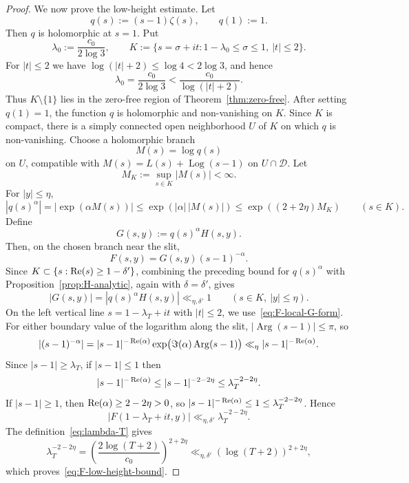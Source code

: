 \begin{proof}
We now prove the low-height estimate. Let
\[
    q(s):=(s-1)\zeta(s),
    \qquad q(1):=1.
\]
Then $q$ is holomorphic at $s=1$. Put
\[
    \lambda_0:=\frac{c_0}{2\log 3},
    \qquad
    K:=\{s=\sigma+it:1-\lambda_0\leq\sigma\leq1,\ |t|\leq2\}.
\]
For $|t|\leq2$ we have $\log(|t|+2)\leq\log4<2\log3$, and hence
\[
    \lambda_0=\frac{c_0}{2\log3}<\frac{c_0}{\log(|t|+2)}.
\]
Thus $K\setminus\{1\}$ lies in the zero-free region of
Theorem~\ref{thm:zero-free}. After setting $q(1)=1$, the function
$q$ is holomorphic and non-vanishing on $K$. Since $K$ is compact,
there is a simply connected open neighborhood $U$ of $K$ on which $q$ is
non-vanishing. Choose a holomorphic branch
\[
    M(s)=\log q(s)
\]
on $U$, compatible with $M(s)=L(s)+\operatorname{Log}(s-1)$
on $U\cap\mathcal{D}$.
Let
\[
    M_K:=\sup_{s\in K}|M(s)|<\infty.
\]
For $|y|\leq\eta$,
\[
    |q(s)^\alpha|
    =|\exp(\alpha M(s))|
    \leq \exp(|\alpha|\,|M(s)|)
    \leq \exp((2+2\eta)M_K)
    \qquad (s\in K).
\]
Define
\begin{equation}\label{eq:G-local-def}
    G(s,y):=q(s)^\alpha H(s,y).
\end{equation}
Then, on the chosen branch near the slit,
\begin{equation}\label{eq:F-local-G-form}
    F(s,y)=G(s,y)(s-1)^{-\alpha}.
\end{equation}
Since $K\subset\{s:\operatorname{Re}(s)\geq1-\delta'\}$, combining the
preceding bound for $q(s)^\alpha$ with
Proposition~\ref{prop:H-analytic}, again with $\delta=\delta'$,
gives
\[
    |G(s,y)|=|q(s)^\alpha H(s,y)|\ll_{\eta,\delta'}1
    \qquad (s\in K,\ |y|\leq\eta).
\]
On the left vertical line $s=1-\lambda_T+it$ with $|t|\leq2$,
we use~\eqref{eq:F-local-G-form}.
For either boundary value of the logarithm along the slit,
$|\operatorname{Arg}(s-1)|\leq\pi$, so
\[
    |(s-1)^{-\alpha}|
    = |s-1|^{-\operatorname{Re}(\alpha)}
      \exp\bigl(\Im(\alpha)\operatorname{Arg}(s-1)\bigr)
    \ll_\eta |s-1|^{-\operatorname{Re}(\alpha)}.
\]
Since $|s-1|\geq\lambda_T$, if $|s-1|\leq1$ then
\[
    |s-1|^{-\operatorname{Re}(\alpha)}
    \leq |s-1|^{-2-2\eta}
    \leq \lambda_T^{-2-2\eta}.
\]
If $|s-1|\geq1$, then $\operatorname{Re}(\alpha)\geq2-2\eta>0$, so
$|s-1|^{-\operatorname{Re}(\alpha)}\leq1\leq\lambda_T^{-2-2\eta}$. Hence
\[
    |F(1-\lambda_T+it,y)|
    \ll_{\eta,\delta'} \lambda_T^{-2-2\eta}.
\]
The definition~\eqref{eq:lambda-T} gives
\[
    \lambda_T^{-2-2\eta}
    = \left(\frac{2\log(T+2)}{c_0}\right)^{2+2\eta}
    \ll_{\eta,\delta'}(\log(T+2))^{2+2\eta},
\]
which proves~\eqref{eq:F-low-height-bound}.
\end{proof}

